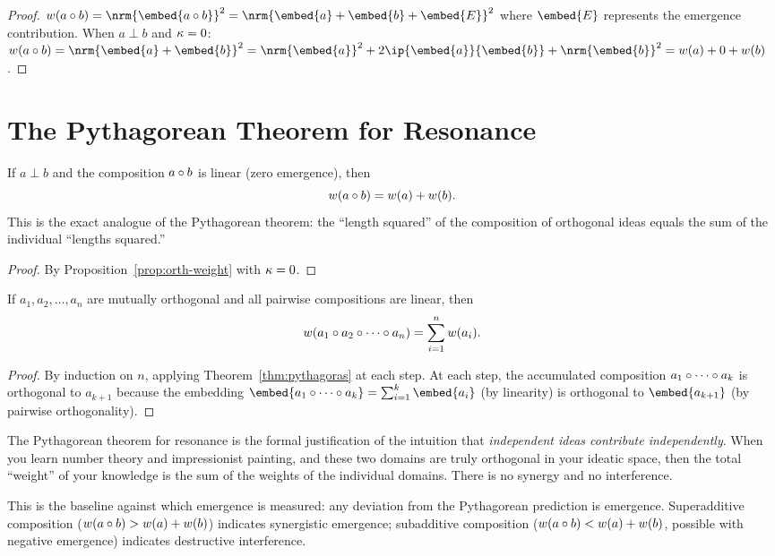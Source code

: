 \begin{proof}
$w(a \compose b) = \nrm{\embed{a \compose b}}^2
= \nrm{\embed{a} + \embed{b} + \embed{E}}^2$
where $\embed{E}$ represents the emergence contribution.  When $a \perp b$
and $\kappa = 0$:
$w(a \compose b) = \nrm{\embed{a} + \embed{b}}^2
= \nrm{\embed{a}}^2 + 2\ip{\embed{a}}{\embed{b}} + \nrm{\embed{b}}^2
= w(a) + 0 + w(b)$.
\end{proof}

\section{The Pythagorean Theorem for Resonance}

\begin{theorem}
\label{thm:pythagoras}
If $a \perp b$ and the composition $a \circ b$ is linear (zero emergence),
then
\[
  w(a \circ b) = w(a) + w(b).
\]
This is the exact analogue of the Pythagorean theorem: the ``length squared''
of the composition of orthogonal ideas equals the sum of the individual
``lengths squared.''
\end{theorem}

\begin{proof}
By Proposition~\ref{prop:orth-weight} with $\kappa = 0$.
\end{proof}

\begin{corollary}
\label{cor:gen-pythagoras}
If $a_1, a_2, \ldots, a_n$ are mutually orthogonal and all pairwise
compositions are linear, then
\[
  w(a_1 \circ a_2 \circ \cdots \circ a_n)
  = \sum_{i=1}^{n} w(a_i).
\]
\end{corollary}

\begin{proof}
By induction on $n$, applying Theorem~\ref{thm:pythagoras} at each step.
At each step, the accumulated composition
$a_1 \circ \cdots \circ a_k$ is orthogonal to $a_{k+1}$ because the
embedding $\embed{a_1 \compose \cdots \compose a_k} = \sum_{i=1}^k \embed{a_i}$
(by linearity) is orthogonal to $\embed{a_{k+1}}$ (by pairwise orthogonality).
\end{proof}

\begin{interpretation}
The Pythagorean theorem for resonance is the formal justification of the
intuition that \emph{independent ideas contribute independently}.  When you
learn number theory and impressionist painting, and these two domains are truly
orthogonal in your ideatic space, then the total ``weight'' of your knowledge
is the sum of the weights of the individual domains.  There is no synergy
and no interference.

This is the baseline against which emergence is measured: any deviation from
the Pythagorean prediction is emergence.  Superadditive composition
($w(a \circ b) > w(a) + w(b)$) indicates synergistic emergence;
subadditive composition ($w(a \circ b) < w(a) + w(b)$, possible with
negative emergence) indicates destructive interference.
\end{interpretation}

